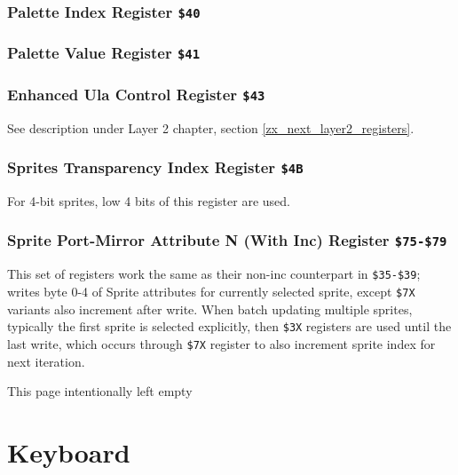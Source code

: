 \documentclass[12pt,twoside,openright,a4paper]{book}
\newcommand{\intentiallyempty}{
	\mbox{}
	\vfill
	\begin{center}
	This page intentionally left empty
	\end{center}
	\vfill
	\mbox{}
}
\begin{document}
\subsubsection{Palette Index Register {\tt \$40}}
\vspace*{-2ex}
\subsubsection{Palette Value Register {\tt \$41}}
\vspace*{-2ex}
\subsubsection{Enhanced Ula Control Register {\tt \$43}}
\vspace*{-2ex}
See description under Layer 2 chapter, section \ref{zx_next_layer2_registers}.


\subsubsection{Sprites Transparency Index Register {\tt \$4B}}

\begin{NextPort}
\end{NextPort}

For 4-bit sprites, low 4 bits of this register are used.


\subsubsection{Sprite Port-Mirror Attribute N (With Inc) Register {\tt \$75-\$79}}

This set of registers work the same as their non-inc counterpart in {\tt \$35-\$39}; writes byte 0-4 of Sprite attributes for currently selected sprite, except {\tt \$7X} variants also increment  after write. When batch updating multiple sprites, typically the first sprite is selected explicitly, then {\tt \$3X} registers are used until the last write, which occurs through {\tt \$7X} register to also increment sprite index for next iteration.

\pagebreak
\intentiallyempty
\pagebreak

\section{Keyboard}
\label{zx_next_keyboard}
\end{document}
